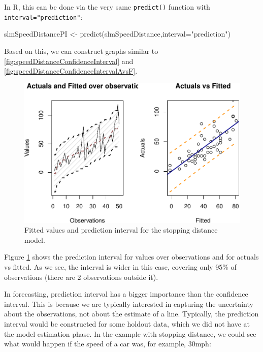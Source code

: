\documentclass[
]{book}
\newenvironment{Shaded}{\begin{snugshade}}{\end{snugshade}}
\newcommand{\AttributeTok}[1]{\textcolor[rgb]{0.77,0.63,0.00}{#1}}
\newcommand{\FunctionTok}[1]{\textcolor[rgb]{0.00,0.00,0.00}{#1}}
\newcommand{\NormalTok}[1]{#1}
\newcommand{\OtherTok}[1]{\textcolor[rgb]{0.56,0.35,0.01}{#1}}
\newcommand{\StringTok}[1]{\textcolor[rgb]{0.31,0.60,0.02}{#1}}
\theoremstyle{definition}
\theoremstyle{definition}
\theoremstyle{definition}
\theoremstyle{definition}
\theoremstyle{remark}
\begin{document}
In R, this can be done via the very same \texttt{predict()} function with \texttt{interval="prediction"}:

\begin{Shaded}
\begin{Highlighting}[]
\NormalTok{slmSpeedDistancePI }\OtherTok{\textless{}{-}} \FunctionTok{predict}\NormalTok{(slmSpeedDistance,}\AttributeTok{interval=}\StringTok{"prediction"}\NormalTok{)}
\end{Highlighting}
\end{Shaded}

Based on this, we can construct graphs similar to \ref{fig:speedDistanceConfidenceInterval} and \ref{fig:speedDistanceConfidenceIntervalAvsF}.

\begin{figure}
\centering
\includegraphics{Svetunkov---Statistics-for-Business-Analytics_files/figure-latex/speedDistancePI-1.pdf}
\caption{\label{fig:speedDistancePI}Fitted values and prediction interval for the stopping distance model.}
\end{figure}

Figure \ref{fig:speedDistancePI} shows the prediction interval for values over observations and for actuals vs fitted. As we see, the interval is wider in this case, covering only 95\% of observations (there are 2 observations outside it).

In forecasting, prediction interval has a bigger importance than the confidence interval. This is because we are typically interested in capturing the uncertainty about the observations, not about the estimate of a line. Typically, the prediction interval would be constructed for some holdout data, which we did not have at the model estimation phase. In the example with stopping distance, we could see what would happen if the speed of a car was, for example, 30mph:
\end{document}
